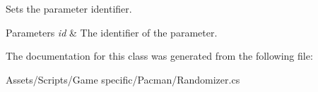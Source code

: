 Sets the parameter identifier. 


\begin{DoxyParams}{Parameters}
{\em id} & The identifier of the parameter.\\
\hline
\end{DoxyParams}


The documentation for this class was generated from the following file\-:\begin{DoxyCompactItemize}
\item 
Assets/\-Scripts/\-Game specific/\-Pacman/Randomizer.\-cs\end{DoxyCompactItemize}
